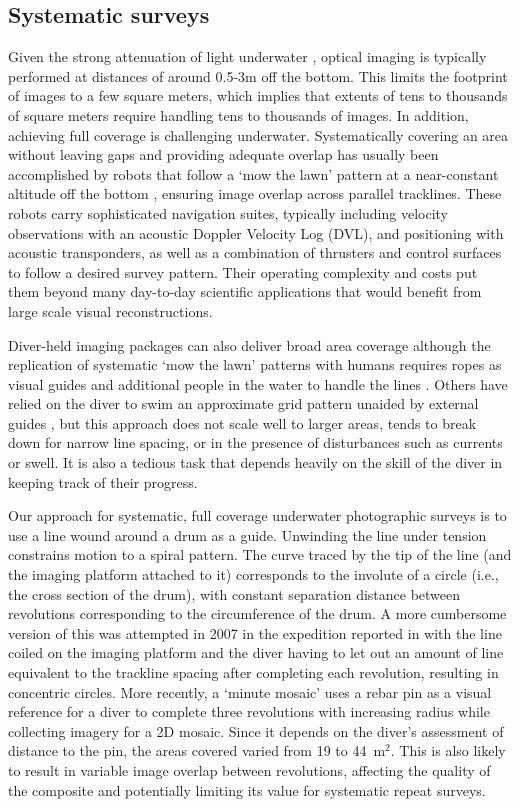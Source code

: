 \subsection{Systematic surveys}
Given the strong attenuation of light underwater \cite{Duntley_1963}, optical imaging is typically performed at distances of around 0.5-3m off the bottom. This limits the footprint of images to a few square meters, which implies that extents of tens to thousands of square meters require handling tens to thousands of images. In addition, achieving full coverage is challenging underwater. Systematically covering an area without leaving gaps and providing adequate overlap has usually been accomplished by robots that follow a `mow the lawn' pattern at a near-constant altitude off the bottom \cite{Bingham_2010}\cite{Williams_2010}, ensuring image overlap across parallel tracklines. These robots carry sophisticated navigation suites, typically including velocity observations with an acoustic Doppler Velocity Log (DVL), and positioning with acoustic transponders, as well as a combination of thrusters and control surfaces to follow a desired survey pattern. Their operating complexity and costs put them beyond many day-to-day scientific applications that would benefit from large scale visual reconstructions.

Diver-held imaging packages can also deliver broad area coverage although the replication of systematic `mow the lawn' patterns with humans requires ropes as visual guides and additional people in the water to handle the lines \cite{Henderson_2013}. Others have relied on the diver to swim an approximate grid pattern unaided by external guides \cite{Burns_2015}, but this approach does not scale well to larger areas, tends to break down for narrow line spacing, or in the presence of disturbances such as currents or swell. It is also a tedious task that depends heavily on the skill of the diver in keeping track of their progress.

Our approach for systematic, full coverage underwater photographic surveys is to use a line wound around a drum as a guide. Unwinding the line under tension constrains motion to a spiral pattern. The curve traced by the tip of the line (and the imaging platform attached to it) corresponds to the involute of a circle (i.e., the cross section of the drum), with constant separation distance between revolutions corresponding to the circumference of the drum. A more cumbersome version of this was attempted in 2007 in the expedition reported in \cite{Camilli_2007} with the line coiled on the imaging platform and the diver having to let out an amount of line equivalent to the trackline spacing after completing each revolution, resulting in concentric circles. More recently, a `minute mosaic' \cite{gintert2012third} uses a rebar pin as a visual reference for a diver to complete three revolutions with increasing radius while collecting imagery for a 2D mosaic. Since it depends on the diver's assessment of distance to the pin, the areas covered varied from 19 to 44~m$^{2}$. This is also likely to result in variable image overlap between revolutions, affecting the quality of the composite and potentially limiting its value for systematic repeat surveys.

